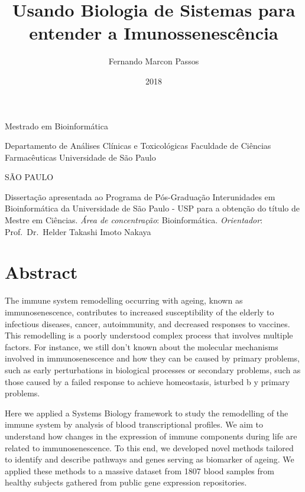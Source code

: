 \documentclass[]{book}
\title{Usando Biologia de Sistemas para entender a Imunossenescência}
\author{Fernando Marcon Passos}
\date{2018}
\begin{document}
\maketitle

{
\setcounter{tocdepth}{1}
\tableofcontents
}
\hypertarget{section}{%
\chapter{}\label{section}}

Mestrado em Bioinformática

Departamento de Análises Clínicas e Toxicológicas
Faculdade de Ciências Farmacêuticas
Universidade de São Paulo

SÃO PAULO

Dissertação apresentada ao Programa de Pós-Graduação Interunidades em Bioinformática da Universidade de São Paulo - USP para a obtenção do título de Mestre em Ciências.
\emph{Área de concentração}: Bioinformática.
\emph{Orientador}: Prof.~Dr.~Helder Takashi Imoto Nakaya

\hypertarget{abstract}{%
\chapter{Abstract}\label{abstract}}

The immune system remodelling occurring with ageing, known as immunosenescence, contributes to increased susceptibility of the elderly to infectious diseases, cancer, autoimmunity, and decreased responses to vaccines. This remodelling is a poorly understood complex process that involves multiple factors. For instance, we still don't known about the molecular mechanisms involved in immunosenescence and how they can be caused by primary problems, such as early perturbations in biological processes or secondary problems, such as those caused by a failed response to achieve homeostasis, isturbed b y primary problems.

Here we applied a Systems Biology framework to study the remodelling of the immune system by analysis of blood transcriptional profiles. We aim to understand how changes in the expression of immune components during life are related to immunosenescence. To this end, we developed novel methods tailored to identify and describe pathways and genes serving as biomarker of ageing. We applied these methods to a massive dataset from 1807 blood samples from healthy subjects gathered from public gene expression repositories.
\end{document}
